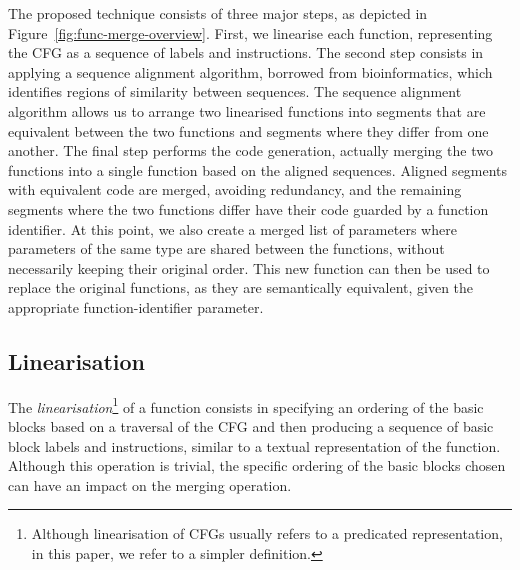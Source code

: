 The proposed technique consists of three major steps, as depicted in
Figure~\ref{fig:func-merge-overview}.
First, we linearise each function, representing the CFG as a sequence of 
labels and instructions.
The second step consists in applying a sequence alignment algorithm, borrowed
from bioinformatics, which identifies regions of similarity between sequences.
The sequence alignment algorithm allows us to arrange two linearised functions
into segments that are equivalent between the two functions and segments where
they differ from one another.
The final step performs the code generation, actually merging the two functions
into a single function based on the aligned sequences.
Aligned segments with equivalent code are merged, avoiding redundancy, %
and the remaining segments where the two functions differ have their code
guarded by a function identifier.
At this point, we also create a merged list of parameters where parameters of
the same type are shared between the functions, without necessarily keeping
their original order.
This new function can then be used to replace the original functions, as they
are semantically equivalent, given the appropriate function-identifier
parameter.

\subsection{Linearisation}

The \textit{linearisation}\footnote{Although linearisation of CFGs
usually refers to a predicated representation, %
in this paper, we refer to a simpler definition.}
of a function consists in specifying an ordering of the basic blocks based on a
traversal of the CFG and then producing a sequence of basic block labels and
instructions, similar to a textual representation of the function.
Although this operation is trivial, the specific ordering of the basic blocks
chosen can have an impact on the merging operation.


